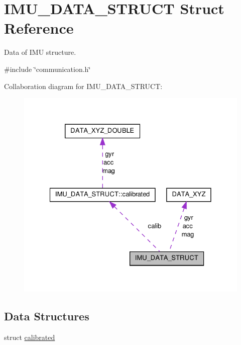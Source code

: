 \hypertarget{structIMU__DATA__STRUCT}{\section{I\-M\-U\-\_\-\-D\-A\-T\-A\-\_\-\-S\-T\-R\-U\-C\-T Struct Reference}
\label{structIMU__DATA__STRUCT}
}


Data of I\-M\-U structure.  




{\ttfamily \#include \char`\"{}communication.\-h\char`\"{}}



Collaboration diagram for I\-M\-U\-\_\-\-D\-A\-T\-A\-\_\-\-S\-T\-R\-U\-C\-T\-:\nopagebreak
\begin{figure}[H]
\begin{center}
\leavevmode
\includegraphics[width=328pt]{structIMU__DATA__STRUCT__coll__graph}
\end{center}
\end{figure}
\subsection*{Data Structures}
\begin{DoxyCompactItemize}
\item 
struct \hyperlink{structIMU__DATA__STRUCT_1_1calibrated}{calibrated}
\end{DoxyCompactItemize}
